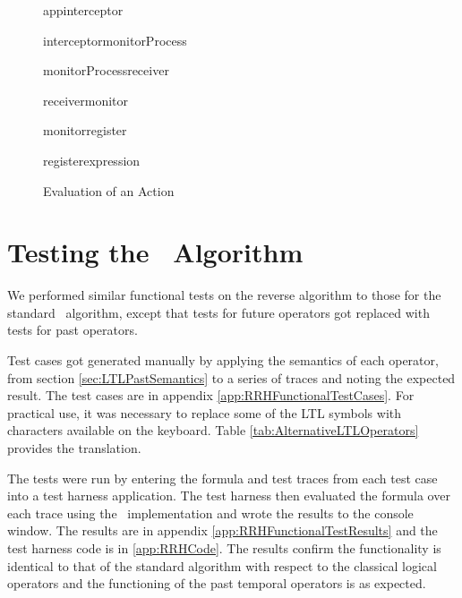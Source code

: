 \begin{figure}[h]
\begin{resizedtikzpicture}{\textwidth}
\begin{umlseqdiag}
\begin{umlcall}[op={action}]{app}{interceptor}
\begin{umlcall}[op={intent}]{interceptor}{monitorProcess}
\begin{umlcall}[op={onReceive(intent)}]{monitorProcess}{receiver}
\begin{umlfragment}[type=loop, label=foreach monitor]
\begin{umlfragment}[type=opt, label=if result.Satisfied, inner xsep=4]
\begin{umlcall}[op={Reset()}]{receiver}{monitor}
								\begin{umlcall}[op={previous.Reset()}]{monitor}{register}
									\begin{umlfragment}[type=loop, label=foreach expression, inner xsep=7]
										\begin{umlcall}[op={Reset()}]{register}{expression}\end{umlcall}
									\end{umlfragment}
								\end{umlcall}
							\end{umlcall}
						\end{umlfragment}
						
					\end{umlfragment}
			\end{umlcall}
			\end{umlcall}
		\end{umlcall}
		\end{umlseqdiag}
	\end{resizedtikzpicture}
    \caption{Evaluation of an Action}
    \label{fig:monitorSequenceDiagram}
\end{figure}

\section{Testing the \RRH\ Algorithm}
\label{sec:Testing The Reverse Rosu-Havelund Algorithm}

We performed similar functional tests on the reverse algorithm to those for the standard \RH\ algorithm, except that tests for future operators got replaced with tests for past operators.

Test cases got generated manually by applying the semantics of each operator, from section \ref{sec:LTLPastSemantics} to a series of traces and noting the expected result.  The test cases are in appendix \ref{app:RRHFunctionalTestCases}.  For practical use, it was necessary to replace some of the LTL symbols with characters available on the keyboard.  Table \ref{tab:AlternativeLTLOperators} provides the translation.

The tests were run by entering the formula and test traces from each test case into a test harness application.  The test harness then evaluated the formula over each trace using the \RRH\ implementation and wrote the results to the console window.  The results are in appendix \ref{app:RRHFunctionalTestResults} and the test harness code is in \ref{app:RRHCode}.  The results confirm the functionality is identical to that of the standard algorithm with respect to the classical logical operators and the functioning of the past temporal operators is as expected.


